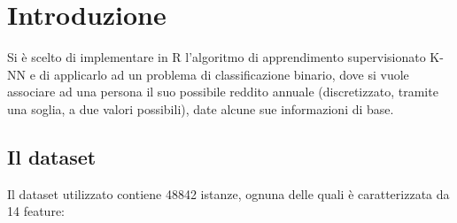 \documentclass[fleqn,10pt]{SelfArx} %
\begin{document}
\flushbottom %

\maketitle %

\tableofcontents %

\thispagestyle{empty} %


\section*{Introduzione} %


Si è scelto di implementare in R l'algoritmo di apprendimento supervisionato K-NN e di applicarlo ad un problema di classificazione binario, dove si vuole associare ad una persona il suo possibile reddito annuale (discretizzato, tramite una soglia, a due valori possibili), date alcune sue informazioni di base. 

\subsection{Il dataset}
Il dataset utilizzato \cite{Lichman:2013} contiene 48842 istanze, ognuna delle quali è caratterizzata da 14 feature:
\end{document}
